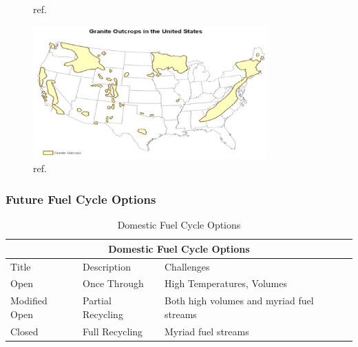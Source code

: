 \begin{frame}[ctb!]
\begin{minipage}{0.44\textwidth}
\begin{figure}[h!]
         \caption{ref.  \cite{newscientist_where_2011}}
     \end{figure}
     \begin{figure}[h!]
         \includegraphics[width=0.8\textwidth]{graniteBush.eps}
         \caption{ref. \cite{bush_economic_1976}}
     \end{figure}
   \end{minipage}
\end{frame}


\begin{frame}[ctb!]
  \frametitle{Future Fuel Cycle Options}
    \begin{table}
      \centering
      \footnotesize{
      \begin{tabular}{|l|l|l|}
        \multicolumn{3}{c}{\textbf{Domestic Fuel Cycle Options}}\\
        \hline
        Title & Description& Challenges \\
        \hline
        Open          & Once Through      & High Temperatures, Volumes \\
        Modified Open & Partial Recycling & Both high volumes and myriad fuel streams \\
        Closed        & Full Recycling    & Myriad fuel streams \\
        \hline
      \end{tabular}
      \caption[Fuel Cycle Options]{Domestic Fuel Cycle Options }
      \label{tab:fco}
      }
    \end{table}
\end{frame}


